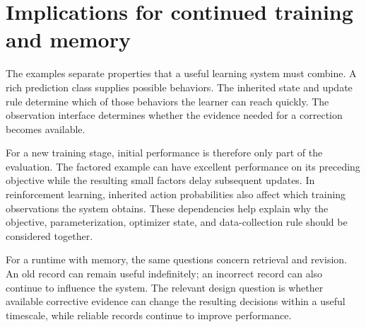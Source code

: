 \documentclass[11pt,twoside]{article}
\theoremstyle{definition}
\theoremstyle{remark}
\begin{document}
\section{Implications for continued training and memory}
\label{sec:implications}

The examples separate properties that a useful learning system must combine.
A rich prediction class supplies possible behaviors. The inherited state
and update rule determine which of those behaviors the learner can reach
quickly. The observation interface determines whether the evidence needed
for a correction becomes available.

For a new training stage, initial performance is therefore only part of
the evaluation. The factored example can have excellent performance on its
preceding objective while the resulting small factors delay subsequent
updates. In reinforcement learning, inherited action probabilities also
affect which training observations the system obtains. These dependencies
help explain why the objective, parameterization, optimizer state, and
data-collection rule should be considered together.

For a runtime with memory, the same questions concern retrieval and revision.
An old record can remain useful indefinitely; an incorrect record can also
continue to influence the system. The relevant design question is whether
available corrective evidence can change the resulting decisions within
a useful timescale, while reliable records continue to improve performance.
\end{document}
